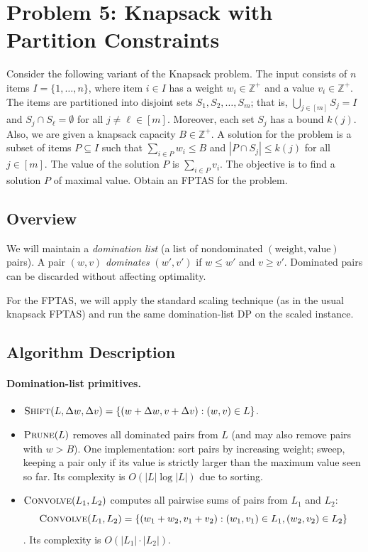 \section*{Problem 5: Knapsack with Partition Constraints}

Consider the following variant of the Knapsack problem. The input consists of $n$ items $I = \{1, \ldots, n\}$, where item $i \in I$ has a weight $w_i \in \mathbb{Z}^+$ and a value $v_i \in \mathbb{Z}^+$. The items are partitioned into disjoint sets $S_1, S_2, \ldots, S_m$; that is, $\bigcup_{j \in [m]} S_j = I$ and $S_j \cap S_\ell = \emptyset$ for all $j \neq \ell \in [m]$. Moreover, each set $S_j$ has a bound $k(j)$. Also, we are given a knapsack capacity $B \in \mathbb{Z}^+$. A solution for the problem is a subset of items $P \subseteq I$ such that $\sum_{i \in P} w_i \leq B$ and $|P \cap S_j| \leq k(j)$ for all $j \in [m]$. The value of the solution $P$ is $\sum_{i \in P} v_i$. The objective is to find a solution $P$ of maximal value. Obtain an FPTAS for the problem.

\subsection*{Overview}
We will maintain a \emph{domination list} (a list of nondominated $(\text{weight},\text{value})$ pairs).
A pair $(w,v)$ \emph{dominates} $(w',v')$ if $w \le w'$ and $v \ge v'$.
Dominated pairs can be discarded without affecting optimality.

For the FPTAS, we will apply the standard scaling technique (as in the usual knapsack FPTAS) and run the same domination-list DP on the scaled instance.

\subsection*{Algorithm Description}
\paragraph{Domination-list primitives.}
\begin{itemize}
    \item $\textsc{Shift}(L, \Delta w, \Delta v) = \{(w+\Delta w, v+\Delta v) : (w,v)\in L\}$.
    \item $\textsc{Prune}(L)$ removes all dominated pairs from $L$ (and may also remove pairs with $w>B$). One implementation: sort pairs by increasing weight; sweep, keeping a pair only if its value is strictly larger than the maximum value seen so far. Its complexity is $O(|L| \log |L|)$ due to sorting.
    \item $\textsc{Convolve}(L_1, L_2)$ computes all pairwise sums of pairs from $L_1$ and $L_2$: \[ \textsc{Convolve}(L_1, L_2) = \{(w_1 + w_2, v_1 + v_2) : (w_1, v_1) \in L_1, (w_2, v_2) \in L_2\} \]. Its complexity is $O(|L_1| \cdot |L_2|)$.
\end{itemize}


